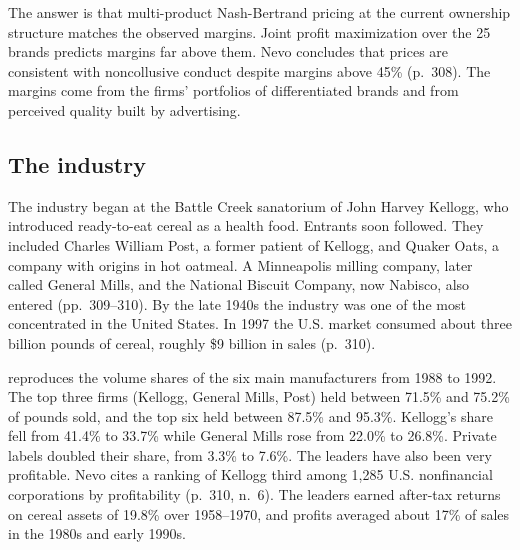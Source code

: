 The answer is that multi-product Nash-Bertrand pricing at the current ownership structure matches the observed
margins. Joint profit maximization over the 25 brands predicts margins far above them. Nevo concludes that
prices are consistent with noncollusive conduct despite margins above 45\% (p.~308). The margins come from the
firms' portfolios of differentiated brands and from perceived quality built by advertising.

\subsection{The industry}\label{sec:08-nevo01-industry}

The industry began at the Battle Creek sanatorium of John Harvey Kellogg, who introduced ready-to-eat cereal as
a health food. Entrants soon followed. They included Charles William Post, a former patient of Kellogg, and
Quaker Oats, a company with origins in hot oatmeal. A Minneapolis milling company, later called General Mills,
and the National Biscuit Company, now Nabisco, also entered (pp.~309--310). By the late 1940s the industry was one of the most concentrated in the United States. In 1997
the U.S. market consumed about three billion pounds of cereal, roughly \$9 billion in sales (p.~310).

 reproduces the volume shares of the six main manufacturers from 1988 to 1992. The
top three firms (Kellogg, General Mills, Post) held between 71.5\% and 75.2\% of pounds sold, and the top six
held between 87.5\% and 95.3\%. Kellogg's share fell from 41.4\% to 33.7\% while General Mills rose from
22.0\% to 26.8\%. Private labels doubled their share, from 3.3\% to 7.6\%. The leaders have also been very
profitable. Nevo cites a ranking of Kellogg third among 1,285 U.S. nonfinancial corporations by profitability
(p.~310, n.~6). The leaders earned after-tax returns on cereal assets of 19.8\% over 1958--1970, and profits
averaged about 17\% of sales in the 1980s and early 1990s.

